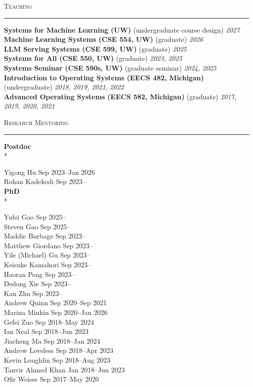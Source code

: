 \documentclass[10pt]{article}
\newcommand{\mysec}[1]{%
  \par\addvspace{2em}%
  \Needspace{8\baselineskip}%
  \noindent\textsc{\large #1}\par\vspace{1mm}\hrule\vspace{2mm}%
}
\newcommand{\mysub}[3]{\textbf{#1} {#2} \hfill {\em #3}}
\begin{document}
\mysec{Teaching}
\mysub{Systems for Machine Learning (UW)}{(undergraduate course design)}{\rm 2027\vspace{2mm}}\\
\mysub{Machine Learning Systems (CSE 554, UW)}{(graduate)}{\rm 2026\vspace{2mm}}\\
\mysub{LLM Serving Systems (CSE 599, UW)}{(graduate)}{\rm 2025\vspace{2mm}}\\
\mysub{Systems for All (CSE 550, UW)}{(graduate)}{\rm 2023, 2025\vspace{2mm}}\\
\mysub{Systems Seminar (CSE 590s, UW)}{(graduate seminar)}{\rm 2024, 2025\vspace{2mm}}\\
\mysub{Introduction to Operating Systems (EECS 482, Michigan)}{(undergraduate)}{\rm 2018, 2019, 2021, 2022\vspace{2mm}} \\
\mysub{Advanced Operating Systems (EECS 582, Michigan)}{(graduate)}{\rm 2017, 2019, 2020, 2021\vspace{2mm}} 

\mysec{Research Mentoring}

\mysub{Postdoc}{}{} \\*

Yigong Hu \hfill Sep 2023--Jan 2026 \\
Rohan Kadekodi \hfill Sep 2023-- \\

\mysub{PhD}{}{} \\*

Yufei Gao \hfill Sep 2025-- \\
Steven Gao \hfill Sep 2025-- \\
Maddie Burbage \hfill Sep 2023-- \\
Matthew Giordano \hfill Sep 2023-- \\
Yile (Michael) Gu \hfill Sep 2023-- \\
Keisuke Kamahori \hfill Sep 2023-- \\
Haoran Peng \hfill Sep 2023-- \\
Dedong Xie \hfill Sep 2023-- \\
Kan Zhu \hfill Sep 2023-- \\
Andrew Quinn \hfill Sep 2020--Sep 2021 \\
Marina Minkin \hfill Sep 2020--Jan 2026 \\
Gefei Zuo \hfill Sep 2018--May 2024\\
Ian Neal \hfill Sep 2018--Jun 2023\\
Jiacheng Ma \hfill Sep 2018--Jan 2024\\
Andrew Loveless \hfill Sep 2018--Apr 2023\\
Kevin Loughlin \hfill Sep 2018--Aug 2023 \\
Tanvir Ahmed Khan \hfill Jan 2018--Jun 2023\\
Ofir Weisse \hfill Sep 2017--May 2020 \\
\end{document}
